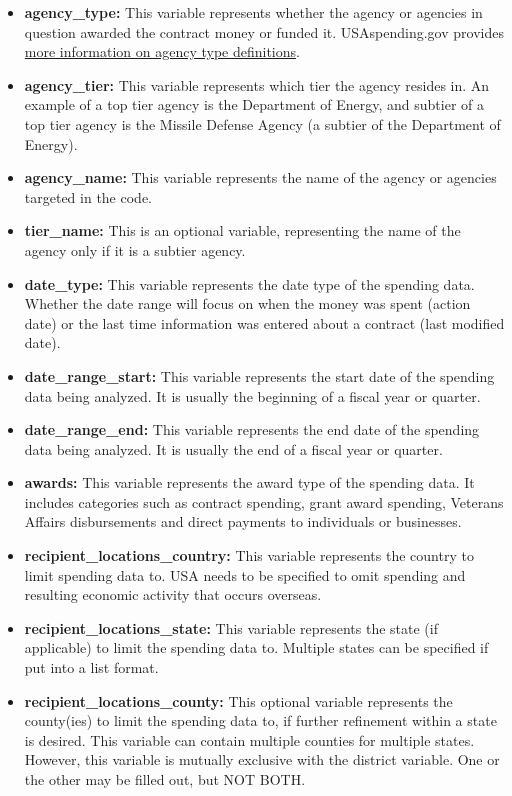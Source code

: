 \documentclass[
]{book}
\providecommand{\tightlist}{%
  \setlength{\itemsep}{0pt}\setlength{\parskip}{0pt}}
\begin{document}
\begin{itemize}
\tightlist
\item
  \textbf{agency\_type:} This variable represents whether the agency or agencies in question awarded the contract money or funded it. USAspending.gov provides \href{https://fedspendingtransparency.github.io/whitepapers/types/}{more information on agency type definitions}.
\item
  \textbf{agency\_tier:} This variable represents which tier the agency resides in. An example of a top tier agency is the Department of Energy, and subtier of a top tier agency is the Missile Defense Agency (a subtier of the Department of Energy).
\item
  \textbf{agency\_name:} This variable represents the name of the agency or agencies targeted in the code.
\item
  \textbf{tier\_name:} This is an optional variable, representing the name of the agency only if it is a subtier agency.
\item
  \textbf{date\_type:} This variable represents the date type of the spending data. Whether the date range will focus on when the money was spent (action date) or the last time information was entered about a contract (last modified date).
\item
  \textbf{date\_range\_start:} This variable represents the start date of the spending data being analyzed. It is usually the beginning of a fiscal year or quarter.
\item
  \textbf{date\_range\_end:} This variable represents the end date of the spending data being analyzed. It is usually the end of a fiscal year or quarter.
\item
  \textbf{awards:} This variable represents the award type of the spending data. It includes categories such as contract spending, grant award spending, Veterans Affairs disbursements and direct payments to individuals or businesses.
\item
  \textbf{recipient\_locations\_country:} This variable represents the country to limit spending data to. USA needs to be specified to omit spending and resulting economic activity that occurs overseas.
\item
  \textbf{recipient\_locations\_state:} This variable represents the state (if applicable) to limit the spending data to. Multiple states can be specified if put into a list format.
\item
  \textbf{recipient\_locations\_county:} This optional variable represents the county(ies) to limit the spending data to, if further refinement within a state is desired. This variable can contain multiple counties for multiple states. However, this variable is mutually exclusive with the district variable. One or the other may be filled out, but NOT BOTH.\\

\end{itemize}
\end{document}
